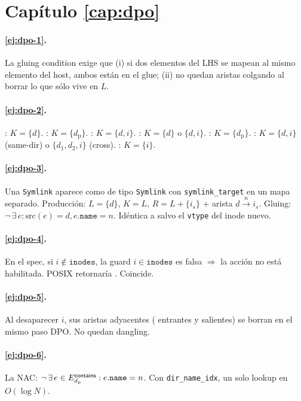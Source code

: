 \section*{Capítulo \ref{cap:dpo}}

\paragraph{\ref{ej:dpo-1}.} La gluing condition exige que (i) si dos
elementos del LHS se mapean al mismo elemento del host, ambos están
en el glue; (ii) no quedan aristas colgando al borrar lo que sólo
vive en $L$.

\paragraph{\ref{ej:dpo-2}.} \opcreate: $K = \{d\}$. \opmkdir: $K =
\{d_{\text{p}}\}$. \oplink: $K = \{d, i\}$. \opunlink: $K = \{d\}$ o
$\{d, i\}$. \oprmdir: $K = \{d_{\text{p}}\}$. \oprename: $K = \{d, i\}$
(same-dir) o $\{d_1, d_2, i\}$ (cross). \opwrite: $K = \{i\}$.

\paragraph{\ref{ej:dpo-3}.} Una \texttt{Symlink} aparece como
\Inode{} de tipo \texttt{Symlink} con \texttt{symlink\_target} en un
mapa separado. Producción: $L = \{d\}$, $K = L$, $R = L + \{i_s\}$ +
arista $d \xrightarrow{n} i_s$. Gluing: $\neg\,\exists\,e: \mathrm{src}(e)=d,
e.\texttt{name}=n$. Idéntica a \opcreate{} salvo el \texttt{vtype} del
inode nuevo.

\paragraph{\ref{ej:dpo-4}.} En el spec, si $i \notin \texttt{inodes}$,
la guard $i \in \texttt{inodes}$ es falsa $\Rightarrow$ la acción no
está habilitada. POSIX retornaría \enoent. Coincide.

\paragraph{\ref{ej:dpo-5}.} Al desaparecer $i$, sus aristas adyacentes
(\econtains{} entrantes y \epointsto{} salientes) se borran en el mismo
paso DPO. No quedan dangling.

\paragraph{\ref{ej:dpo-6}.} La NAC: $\neg\,\exists\,e \in
E_{d_{\text{p}}}^{\textsf{contains}}: e.\texttt{name} = n$. Con
\texttt{dir\_name\_idx}, un solo lookup en $O(\log N)$.

